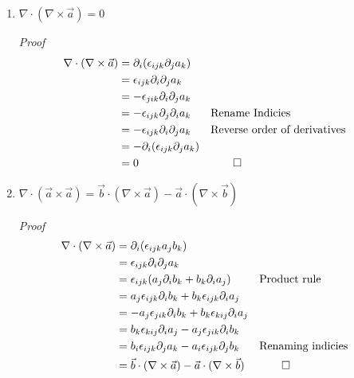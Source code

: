\documentclass[11pt,twoside]{article}
\renewcommand{\d}{\partial}
\newcommand{\vect}[1]{\vec{#1}}
\newcommand{\grad}{\nabla}
\newcommand{\cross}{\times}
\begin{document}
\begin{enumerate}
\clearpage
%
%
\item $\grad\cdot(\grad\cross\vect{a})=0$

\textit{Proof}
\begin{align*}
\grad\cdot(\grad\cross\vect{a}) & = \d_i(\epsilon_{ijk}\d_ja_k)\\
                                & =  \epsilon_{ijk}\d_i\d_ja_k\\
                                & = -\epsilon_{jik}\d_i\d_ja_k\\
                                & = -\epsilon_{ijk}\d_j\d_ia_k && \text{Rename Indicies}\\
                                & = -\epsilon_{ijk}\d_i\d_ja_k && \text{Reverse order of derivatives}\\
                                & = -\d_i(\epsilon_{ijk}\d_ja_k)\\
                                & = 0 && \qed\\
\end{align*}


%
%
\item $\grad\cdot(\vect{a}\cross\vect{a})=\vect{b}\cdot(\grad\cross\vect{a})-\vect{a}\cdot(\grad\cross\vect{b})$

\textit{Proof} 
\begin{align*}
\grad\cdot(\grad\cross\vect{a}) & = \d_i(\epsilon_{ijk}a_jb_k)\\
                                & = \epsilon_{ijk}\d_i\d_ja_k\\
                                & = \epsilon_{ijk}(a_j\d_ib_k+b_k\d_ia_j) && \text{Product rule}\\
                                & = a_j\epsilon_{ijk}\d_ib_k+b_k\epsilon_{ijk}\d_ia_j\\
                                & = -a_j\epsilon_{jik}\d_ib_k+b_k\epsilon_{kij}\d_ia_j\\
                                & = b_k\epsilon_{kij}\d_ia_j-a_j\epsilon_{jik}\d_ib_k\\
                                & = b_i\epsilon_{ijk}\d_ja_k-a_i\epsilon_{ijk}\d_jb_k &&\text{Renaming indicies}\\
                                & = \vect{b}\cdot(\grad\cross\vect{a})-\vect{a}\cdot(\grad\cross\vect{b})&& \qed
\end{align*}



\end{enumerate}
\end{document}
